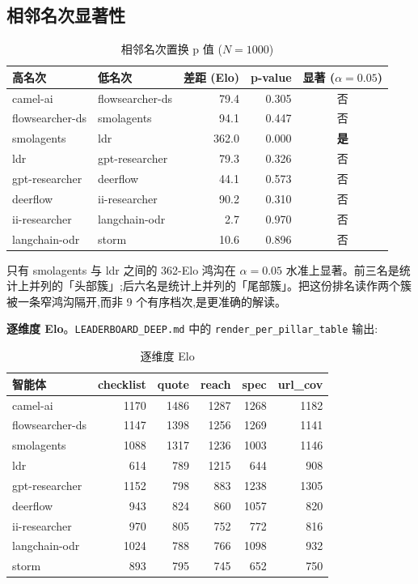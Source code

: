 \documentclass[UTF8,a4paper,12pt,oneside]{ctexart}
\begin{document}
\subsection{相邻名次显著性}

\begin{table}[ht]
\centering
\small
\caption{相邻名次置换 p 值 (\(N = 1000\))}
\label{tab:signif}
\begin{tabular}{l l r r c}
\toprule
高名次 & 低名次 & 差距 (Elo) & p-value & 显著 (\(\alpha = 0.05\)) \\
\midrule
camel-ai & flowsearcher-ds & 79.4 & 0.305 & 否 \\
flowsearcher-ds & smolagents & 94.1 & 0.447 & 否 \\
smolagents & ldr & 362.0 & 0.000 & \textbf{是} \\
ldr & gpt-researcher & 79.3 & 0.326 & 否 \\
gpt-researcher & deerflow & 44.1 & 0.573 & 否 \\
deerflow & ii-researcher & 90.2 & 0.310 & 否 \\
ii-researcher & langchain-odr & 2.7 & 0.970 & 否 \\
langchain-odr & storm & 10.6 & 0.896 & 否 \\
\bottomrule
\end{tabular}
\end{table}

只有 smolagents 与 ldr 之间的 362-Elo 鸿沟在 \(\alpha = 0.05\) 水准上显著。前三名是统计上并列的「头部簇」;后六名是统计上并列的「尾部簇」。把这份排名读作两个簇被一条窄鸿沟隔开,而非 9 个有序档次,是更准确的解读。

\textbf{逐维度 Elo}。\texttt{LEADERBOARD\_DEEP.md} 中的 \texttt{render\_per\_pillar\_table} 输出:

\begin{table}[ht]
\centering
\small
\caption{逐维度 Elo}
\begin{tabular}{l r r r r r}
\toprule
智能体 & checklist & quote & reach & spec & url\_cov \\
\midrule
camel-ai & 1170 & 1486 & 1287 & 1268 & 1182 \\
flowsearcher-ds & 1147 & 1398 & 1256 & 1269 & 1141 \\
smolagents & 1088 & 1317 & 1236 & 1003 & 1146 \\
ldr & 614 & 789 & 1215 & 644 & 908 \\
gpt-researcher & 1152 & 798 & 883 & 1238 & 1305 \\
deerflow & 943 & 824 & 860 & 1057 & 820 \\
ii-researcher & 970 & 805 & 752 & 772 & 816 \\
langchain-odr & 1024 & 788 & 766 & 1098 & 932 \\
storm & 893 & 795 & 745 & 652 & 750 \\
\bottomrule
\end{tabular}
\end{table}
\end{document}

